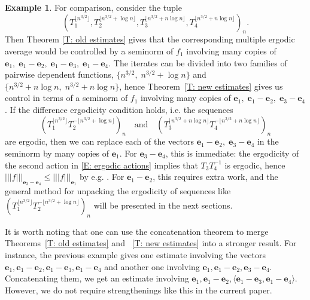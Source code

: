 \documentclass[11pt]{amsart}
\theoremstyle{definition}
\newtheorem{example}[lemma]{Example}
\newcommand{\be}{{\mathbf{e}}}
\newcommand{\nnorm}[1]{\lvert\!|\!| #1|\!|\!\rvert}
\newcommand{\inv}{^{-1}}
\newcommand{\1}{{\mathbf{1}}}
\newcommand{\sfloor}[1]{{\lfloor #1 \rfloor}}
\begin{document}
\begin{example}
    For comparison, consider the tuple $$(T_1^{\sfloor{n^{3/2}}}, T_2^{\sfloor{n^{3/2}+\log n}}, T_3^{\sfloor{n^{3/2}+n\log n}}, T_4^{\sfloor{n^{3/2}+n\log n}})_n.$$ Then Theorem \ref{T: old estimates} gives that the corresponding multiple ergodic average would be controlled by a seminorm of $f_1$ involving many copies of $\be_1,\; \be_1 - \be_2,\; \be_1-\be_3,\; \be_1 - \be_4$. The iterates can be divided into two families of pairwise dependent functions, $\{n^{3/2},\; n^{3/2} + \log n\}$ and $\{n^{3/2}+ n\log n,\; n^{3/2} + n\log n\}$,  hence Theorem~\ref{T: new estimates} gives us control in terms of a seminorm of $f_1$ involving many copies of $\be_1,\; \be_1 - \be_2,\; \be_3-\be_4$. If the difference ergodicity condition holds, i.e. the sequences
    \begin{equation}\label{E: ergodic actions}
        (T_1^{\sfloor{n^{3/2}}} T_2^{-\sfloor{n^{3/2}+\log n}})_n\quad \textrm{and} \quad (T_3^{\sfloor{n^{3/2} + n\log n}}T_4^{-\sfloor{n^{3/2} + n\log n}})_n
    \end{equation}
    are ergodic, then we can replace each of the vectors $\be_1 - \be_2,\; \be_3-\be_4$ in the seminorm by many copies of $\be_1$. For $\be_3-\be_4$, this is immediate: the ergodicity of the second action in \eqref{E: ergodic actions}
    implies that $T_3T_4\inv$ is ergodic, hence $\nnorm{f}_{\be_3-\be_4}\leq \nnorm{f}_{\be_1}$ by e.g. \cite[Lemma 2.2]{FrKu22a}. For $\be_1-\be_2$, this requires extra work, and the general method for unpacking the ergodicity of sequences like $(T_1^{\sfloor{n^{3/2}}} T_2^{-\sfloor{n^{3/2}+\log n}})_n$ will be presented in the next sections.
\end{example}

It is worth noting that one can use the concatenation theorem to merge Theorems~\ref{T: old estimates} and ~\ref{T: new estimates} into a stronger result. For instance, the previous example gives one estimate involving the vectors $\be_{1},\be_{1}-\be_{2},\be_{1}-\be_{3},\be_{1}-\be_{4}$ and another one involving $\be_{1},\be_{1}-\be_{2},\be_{3}-\be_{4}$. Concatenating them, we get an estimate involving $\be_{1},\be_{1}-\be_{2},\langle\be_{1}-\be_{3},\be_{1}-\be_{4}\rangle$. However, we do not require strengthenings like this in the current paper.
\end{document}
